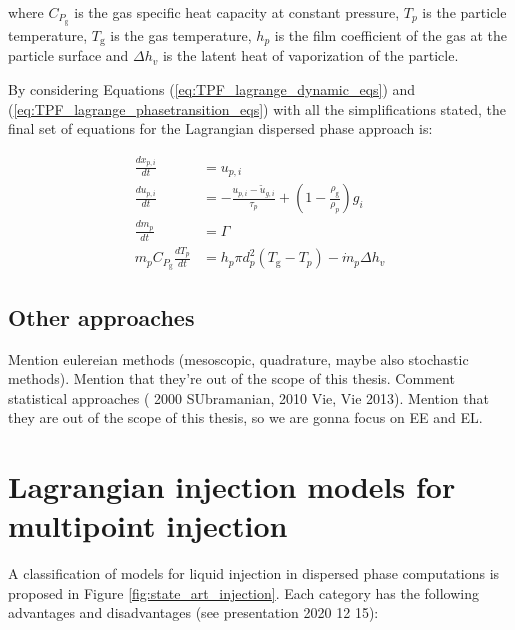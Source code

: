 where $C_{P_\mathrm{g}}$ is the gas specific heat capacity at constant pressure, $T_p$ is the particle temperature, $T_\mathrm{g}$ is the gas temperature, $h_p$ is the film coefficient of the gas at the particle surface and $\Delta h_v$ is the latent heat of vaporization of the particle. 

By considering Equations (\ref{eq:TPF_lagrange_dynamic_eqs}) and (\ref{eq:TPF_lagrange_phasetransition_eqs}) with all the simplifications stated, the final set of equations for the Lagrangian dispersed phase approach is:

\begin{subequations}
\begin{align}
\frac{d x_{p,i}}{d t} &= u_{p,i} \\
\frac{d u_{p,i}}{d t} &= - \frac{u_{p,i} - \widetilde{u}_{g,i} }{\tau_p} + \left( 1 - \frac{\rho_\mathrm{g}}{\rho_p} \right) g_i \\
\frac{d m_p}{d t} &= \Gamma \\
m_p C_{P_\mathrm{g}} \frac{d T_p}{d t} &= h_p \pi d_p^2 \left( T_\mathrm{g} - T_p \right) - \dot{m}_p  \Delta h_v
\end{align}
\end{subequations}

\subsection{Other approaches}

Mention eulereian methods (mesoscopic, quadrature, maybe also stochastic methods). Mention that they're out of the scope of this thesis. Comment statistical approaches ( 2000 SUbramanian, 2010 Vie, Vie 2013). Mention that they are out of the scope of this thesis, so we are gonna focus on EE and EL.


\section{Lagrangian injection models for multipoint injection}
\label{sec:ch3_state_art_lagrangian_injection}

A classification of models for liquid injection in dispersed phase computations is proposed in Figure \ref{fig:state_art_injection}. Each category has the following advantages and disadvantages (see presentation 2020 12 15):

